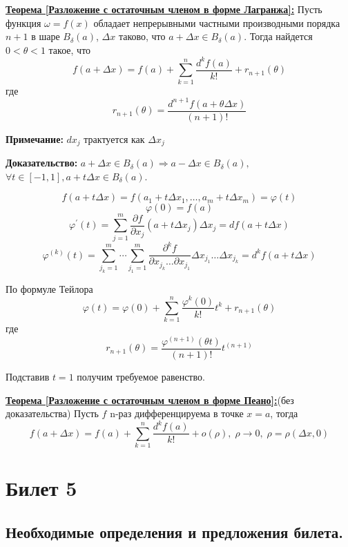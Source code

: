\documentclass[a4paper,12pt]{article} %
\begin{document}
\underline{\textbf{Теорема [Разложение с остаточным членом в форме Лагранжа]:}} Пусть функция $\omega = f(x)$ обладает непрерывными частными производными порядка $n+1$ в шаре $B_\delta(a)$, $\Delta x$ таково, что $a+\Delta x\in B_\delta(a)$. Тогда найдется $0<\theta<1$ такое, что 
\[
	f(a+\Delta x) = f(a) + \sum\limits_{k=1}^n\frac{d^k f(a)}{k!}+r_{n+1}(\theta)
\]
где
\[
	r_{n+1}(\theta) = \frac{d^{n+1}f(a+\theta \Delta x)}{(n+1)!}
\]

\textbf{Примечание:} $dx_j$ трактуется как $\Delta x_j$
\vspace{5mm}

\textbf{Доказательство:} $a+\Delta x\in B_\delta(a) \Rightarrow a-\Delta x\in B_\delta(a), $ $\forall t\in[-1, 1], a+t\Delta x\in B_\delta(a)$.

\[
	f(a + t\Delta x) = f(a_1 + t\Delta x_1, \dots, a_m + t\Delta x_m) = \varphi(t)
\]
\[
	\varphi(0) = f(a)
\]
\[
	\varphi^{'}(t) = \sum\limits_{j=1}^m \frac{\partial f}{\partial x_j}(a+t\Delta x_j)\Delta x_j = df(a+t\Delta x)
\]
\[
	\varphi^{(k)}(t) = \sum\limits_{j_k=1}^m\cdots\sum\limits_{j_1=1}^m\frac{\partial^kf}{\partial x_{j_k}\dots\partial x_{j_1}}\Delta x_{j_1}\dots \Delta x_{j_k} = d^kf(a+t\Delta x)
\]

По формуле Тейлора
\[
	\varphi(t) = \varphi(0) +\sum\limits_{k=1}^n\frac{\varphi^k(0)}{k!}t^k + r_{n+1}(\theta)
\]
где
\[
	r_{n+1}(\theta) = \frac{\varphi^{(n+1)}(\theta t)}{(n+1)!}t^{(n+1)}
\]

Подставив $t=1$ получим требуемое равенство.
\vspace{5mm}

\underline{\textbf{Теорема [Разложение с остаточным членом в форме Пеано]:}}(без доказательства) Пусть $f$ n-раз дифференцируема в точке $x =a$, тогда
\[
	f(a+\Delta x) = f(a) + \sum\limits_{k=1}^n\frac{d^kf(a)}{k!}+o(\rho),  \; \rho\to 0, \; \rho =  \rho(\Delta x, 0)
\]


\newpage
\section{Билет 5}

\subsection{Необходимые определения и предложения билета.}
\end{document}

